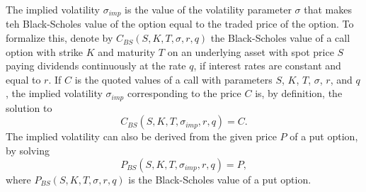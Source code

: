 The implied volatility $ \sigma_{imp} $ is the value of the volatility
    parameter $ \sigma $ that makes teh Black-Scholes value of the option equal
    to the traded price of the option.
To formalize this, denote by $ C_{BS}(S,K,T,\sigma,r,q) $ the Black-Scholes
    value of a call option with strike $ K $ and maturity $ T $ on an
    underlying asset with spot price $ S $ paying dividends continuously at the
    rate $ q $, if interest rates are constant and equal to $ r $.
If $ C $ is the quoted values of a call with parameters $ S $, $ K $, $ T $,
    $ \sigma $, $ r $, and $ q $, the implied volatility $ \sigma_{imp} $
    corresponding to the price $ C $ is, by definition, the solution to
\begin{equation}
    C_{BS}(S, K, T, \sigma_{imp}, r, q) = C.
\end{equation}
The implied volatility can also be derived from the given price $ P $ of a put
    option, by solving
\begin{equation}
    P_{BS}(S, K, T, \sigma_{imp}, r, q) = P,
\end{equation}
where $ P_{BS}(S,K,T,\sigma,r,q) $ is the Black-Scholes value of a put option.
